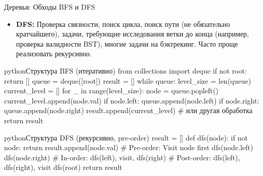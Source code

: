 \begin{textbox}{Деревья: Обходы BFS и DFS}
\begin{itemize}[nosep, leftmargin=*]
        \item \textbf{DFS:} Проверка связности, поиск цикла, поиск пути (не обязательно кратчайшего), задачи, требующие исследования ветки до конца (например, проверка валидности BST), многие задачи на бэктрекинг. Часто проще реализовать рекурсивно.
    \end{itemize}
    \begin{codebox}{python}{Структура BFS (итеративно)}
    from collections import deque
    if not root: return []
    queue = deque([root])
    result = []
    while queue:
        level_size = len(queue)
        current_level = []
        for _ in range(level_size):
            node = queue.popleft()
            current_level.append(node.val)
            if node.left: queue.append(node.left)
            if node.right: queue.append(node.right)
        result.append(current_level) # или другая обработка
    return result
    \end{codebox}
    \begin{codebox}{python}{Структура DFS (рекурсивно, pre-order)}
    result = []
    def dfs(node):
        if not node: return
        result.append(node.val) # Pre-order: Visit node first
        dfs(node.left)
        dfs(node.right)
        # In-order: dfs(left), visit, dfs(right)
        # Post-order: dfs(left), dfs(right), visit
    dfs(root)
    return result
    \end{codebox}
\end{textbox}

